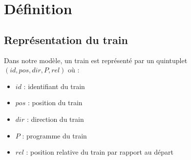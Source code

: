 \documentclass[12pt]{article}
\begin{document}
\newcommand\ruleUntilConsEv[4]{ %
    \inferrule
    { suiv(#2, #3) = #4 \\ #2 \neq #4 \\ R.A[#1] \neq #2 \\ ev(#1, #4) \in R.E \\ apply(R, ev(#1, #4)) = R'}
    {\trainfull{#1}{#2}{#3}{\concat{Until(#4)}{P'}}, R \Rightarrow \trainfull{#1}{#4}{#3}{P'}, R'}
}

\newcommand\ruleWait[4]{ %
    \inferrule
    {R.A[#1] = #2 \\ ev(#1,#2) \in R.E \\ R.E[ev[#1, #2]].P = att(#4)  \\ apply(R, ev(#1, #2)) = R'}
    {\trainfull{#1}{#2}{#3}{P}, R \Rightarrow \trainfull{#1}{#2}{#3}{P}, R'}
}

\newcommand\ruleCrash[2]{ %
    \inferrule
        {#1 \neq #2}
        {\Gamma, \train{#1}{pos}{dir}{P}, \train{#2}{pos}{dir'}{P'}  \Rightarrow \bot}
}

\newcommand\ruleCrashSec[3]{ %
    \inferrule
        {\lnot suiv(#2, #3) = \emptyset \\ #3 \neq * \\ R.A[#1] \neq #2}
        {\trainfull{#1}{#2}{#3}{P}, R \Rightarrow \bot}
}
\fi



\maketitle


\section{Définition}

\subsection{Représentation du train}
Dans notre modèle, un train est représenté par un quintuplet $(id, pos, dir, P, rel)$ où :
\begin{itemize}
    \item $id$ : identifiant du train
    \item $pos$ : position du train 
    \item $dir$ : direction du train
    \item $P$ : programme du train
    \item $rel$ : position relative du train par rapport au départ
\end{itemize}
\end{document}
